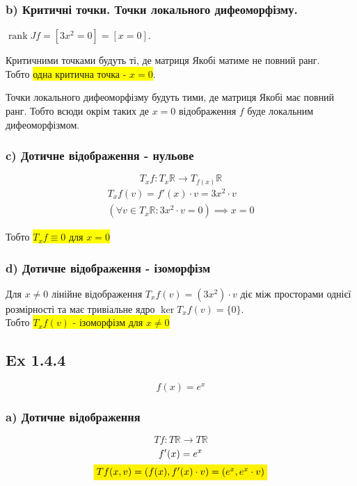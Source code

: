 \documentclass[10pt, a4paper]{article} %
\newcommand{\R}{\mathbb{R}}
\DeclareMathOperator{\rank}{rank}
\begin{document}
\subsubsection*{b) Критичні точки. Точки локального дифеоморфізму.}
$\rank Jf = [3x^2 = 0] = [x = 0]$.

Критичними точками будуть ті, де матриця Якобі матиме не повний ранг.\\
Тобто \colorbox{yellow}{одна критична точка - $x = 0$}.

Точки локального дифеоморфізму будуть тими, де матриця Якобі має повний ранг.
Тобто всюди окрім таких де $x = 0$ відображення $f$ буде локальним дифеоморфізмом.

\subsubsection*{c) Дотичне відображення - нульове}
\[T_{x}f : T_{x}\R \to T_{f(x)}\R\]
\begin{gather*}
    T_{x}f(v) = f'(x) \cdot v = 3x^2 \cdot v\\
    \left(\forall v\in T_{x}\R: 3x^2 \cdot v = 0\right) \implies  x=0
\end{gather*}

Тобто \colorbox{yellow}{$T_{x}f \equiv 0$ для $x=0$}

\subsubsection*{d) Дотичне відображення - ізоморфізм}

Для $x \ne 0$ лінійне відображення $T_{x}f(v) = (3x^2) \cdot v$ діє між просторами однієї розмірності та має тривіальне ядро $\ker T_{x}f(v) = \{0\}$. \\
Тобто \colorbox{yellow}{$T_{x}f(v)$ - ізоморфізм для $x\ne 0$}



\subsection*{Ex 1.4.4}
\begin{mdframed}
    \[f(x) = e^x\]
\end{mdframed}

\subsubsection*{a) Дотичне відображення}
\[Tf : T\R \to T\R\]
\begin{gather*}
    f'(x) = e^x\\
    \colorbox{yellow}{$Tf(x,v) = (f(x), f'(x)\cdot v) = (e^x, e^x \cdot v)$}
\end{gather*}
\end{document}
